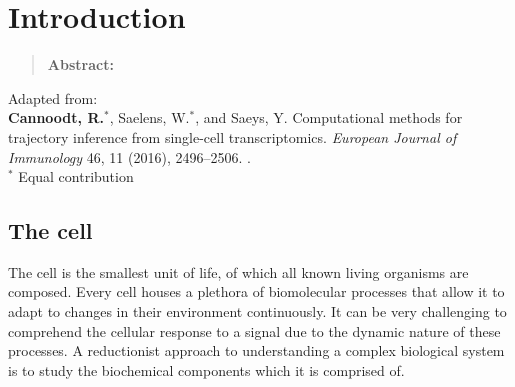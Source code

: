\newpage{\thispagestyle{empty}\cleardoublepage}
\chapter{Introduction} 
\label{chap:introduction}

\begin{quote}
	\textbf{Abstract:} 
	
\end{quote}

\vfill

Adapted from:\\
\textbf{Cannoodt, R.}$^*$, Saelens, W.$^*$, and Saeys, Y. Computational methods for trajectory inference from single-cell transcriptomics. \textit{European Journal of Immunology} 46, 11 (2016), 2496--2506. .\\
{\footnotesize $^*$ Equal contribution}
\newpage

\section{The cell}
The cell is the smallest unit of life, of which all known living organisms are composed. Every cell houses a plethora of biomolecular processes that allow it to adapt to changes in their environment continuously. It can be very challenging to comprehend the cellular response to a signal due to the dynamic nature of these processes. A reductionist approach to understanding a complex biological system is to study the biochemical components which it is comprised of\cite{brigandt_reductionismbiology_2017}.

